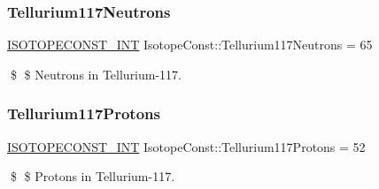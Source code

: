 \subsubsection{\texorpdfstring{Tellurium117\+Neutrons}{Tellurium117Neutrons}}
{\footnotesize\ttfamily \mbox{\hyperlink{group___isotope_const-_macros_ga5f18360b3e99483a35c32d789e62621c}{I\+S\+O\+T\+O\+P\+E\+C\+O\+N\+S\+T\+\_\+\+I\+NT}} Isotope\+Const\+::\+Tellurium117\+Neutrons = 65}

\$ \$ Neutrons in Tellurium-\/117. \mbox{\label{group___isotope_const-_tellurium-_te117_ga138af6163db6318e963662f8bdef1f54}} 
\subsubsection{\texorpdfstring{Tellurium117\+Protons}{Tellurium117Protons}}
{\footnotesize\ttfamily \mbox{\hyperlink{group___isotope_const-_macros_ga5f18360b3e99483a35c32d789e62621c}{I\+S\+O\+T\+O\+P\+E\+C\+O\+N\+S\+T\+\_\+\+I\+NT}} Isotope\+Const\+::\+Tellurium117\+Protons = 52}

\$ \$ Protons in Tellurium-\/117. 